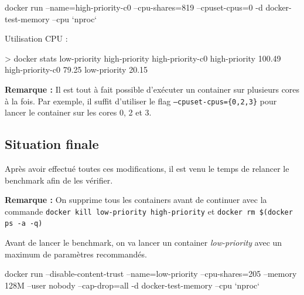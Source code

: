\documentclass[11pt,a4paper,oneside]{report}
\newcommand{\code}[1]{\texttt{#1}}
\begin{document}
\begin{textcode}
docker run --name=high-priority-c0 --cpu-shares=819 --cpuset-cpus=0 -d docker-test-memory --cpu `nproc`
\end{textcode}

Utilisation CPU :
\begin{textcode}
> docker stats low-priority high-priority high-priority-c0
high-priority       100.49%
high-priority-c0    79.25%
low-priority        20.15%
\end{textcode}

\textbf{Remarque :} Il est tout à fait possible d'exécuter un container sur plusieurs cores à la fois. Par exemple, il suffit d'utiliser le flag \code{--cpuset-cpus=\{0,2,3\}} pour lancer le container sur les cores 0, 2 et 3.


\subsection{Situation finale}
Après avoir effectué toutes ces modifications, il est venu le temps de relancer le benchmark afin de les vérifier.

\textbf{Remarque :} On supprime tous les containers avant de continuer avec la commande \code{docker kill low-priority high-priority} et \code{docker rm \$(docker ps -a -q)}

Avant de lancer le benchmark, on va lancer un container \textit{low-priority} avec un maximum de paramètres recommandés.

\begin{textcode}
docker run --disable-content-trust --name=low-priority --cpu-shares=205 --memory 128M --user nobody --cap-drop=all -d docker-test-memory --cpu `nproc`
\end{textcode}
\end{document}
